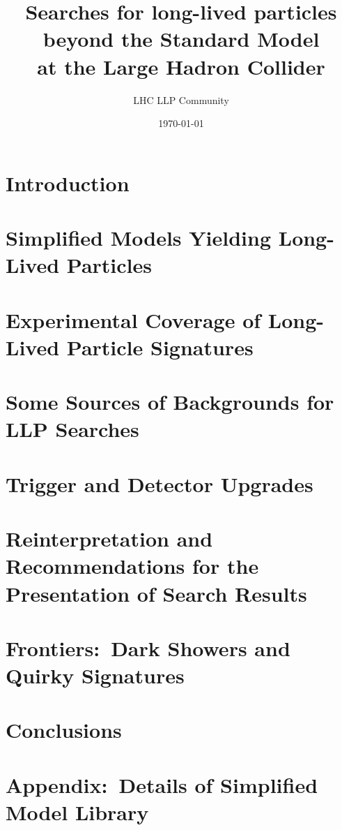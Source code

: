 \documentclass[a4paper,debug,notitlepage,nobib]{tufte-book}
\title{Searches for long-lived particles beyond the Standard Model \\ \smallskip \noindent at the Large Hadron Collider}
\author{LHC LLP Community}
\date{\today}
\begin{document}
\setcounter{secnumdepth}{3} %



\setcounter{tocdepth}{1}
\tableofcontents
 

\chapter{Introduction}
\label{sec:Introduction}


\chapter{Simplified Models Yielding Long-Lived Particles}
\label{sec:simplifiedmodel}


\chapter{Experimental Coverage of Long-Lived Particle Signatures}
\label{sec:experimentcoverage}


\chapter{Some Sources of Backgrounds for LLP Searches}
\label{sec:backgrounds}


\chapter{Trigger and Detector Upgrades}
\label{sec:triggers}


\chapter{Reinterpretation and Recommendations for the Presentation of Search Results}
\label{sec:reint}





 



\chapter{Frontiers:~Dark Showers and Quirky Signatures}
\label{sec:showers}


\chapter{Conclusions}
\label{sec:conclusions}


\appendix

\chapter{Appendix:~Details of Simplified Model Library}
\label{sec:library_more}


\printbibliography
\end{document}
